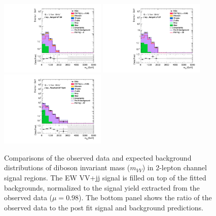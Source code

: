 \begin{figure}[]
    \centering
    \includegraphics[width=0.45\textwidth]{figures/PostFit/Region_distMllJ_DSRVBSHP_BMin0_J0_incJet1_L2_T0_incFat1_Y6051_incTag1_Fat1_GlobalFit_unconditionnal_mu1log.pdf}
    \includegraphics[width=0.45\textwidth]{figures/PostFit/Region_distMllJ_DSRVBSLP_BMin0_J0_incJet1_L2_T0_incFat1_Y6051_incTag1_Fat1_GlobalFit_unconditionnal_mu1log.pdf}
    \includegraphics[width=0.45\textwidth]{figures/PostFit/Region_distMlljj_DSRVBSFid_BMin0_T0_Y6051_incTag1_J2_L2_incJet1_GlobalFit_unconditionnal_mu1log.pdf}
    \caption{Comparisons of the observed data and expected background distributions of diboson invariant mass ($m_{VV}$) in 2-lepton channel signal regions. The EW VV+jj signal is filled on top of the fitted backgrounds, normalized to the signal yield extracted from the observed data ($\mu = 0.98$). The bottom panel shows the ratio of the observed data to the post fit signal and background predictions.}
    \label{fig:postSR2lepmvv}
\end{figure}

